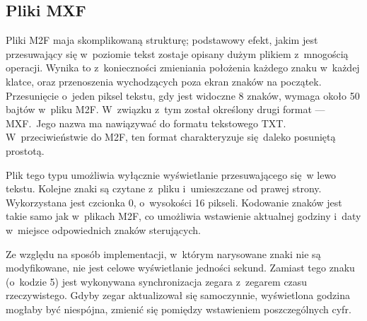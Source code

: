 \subsection{Pliki MXF}
\label{mxf-desc}
Pliki M2F maja skomplikowaną strukturę; podstawowy efekt, jakim jest przesuwający się w~poziomie tekst zostaje opisany dużym plikiem z~mnogością operacji. Wynika to z~konieczności zmieniania położenia każdego znaku w~każdej klatce, oraz przenoszenia wychodzących poza ekran znaków na początek. Przesunięcie o~jeden piksel tekstu, gdy jest widoczne 8 znaków, wymaga około 50 bajtów w~pliku M2F. W~związku z~tym został określony drugi format --- MXF.~Jego nazwa ma nawiązywać do formatu tekstowego TXT. W~przeciwieństwie do M2F, ten format charakteryzuje się daleko posuniętą prostotą.

Plik tego typu umożliwia wyłącznie wyświetlanie przesuwającego się w lewo tekstu. Kolejne znaki są czytane z~pliku i~umieszczane od prawej strony. Wykorzystana jest czcionka 0, o~wysokości 16 pikseli. Kodowanie znaków jest takie samo jak w~plikach M2F, co umożliwia wstawienie aktualnej godziny i~daty w~miejsce odpowiednich znaków sterujących.

Ze względu na sposób implementacji, w~którym narysowane znaki nie są modyfikowane, nie jest celowe wyświetlanie jedności sekund. Zamiast tego znaku (o~kodzie 5) jest wykonywana synchronizacja zegara z~zegarem czasu rzeczywistego. Gdyby zegar aktualizował się samoczynnie, wyświetlona godzina mogłaby być niespójna, zmienić się pomiędzy wstawieniem poszczególnych cyfr.


